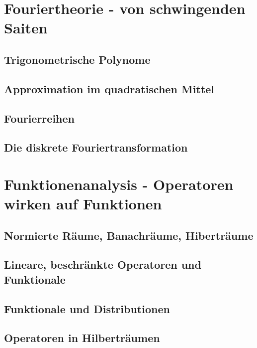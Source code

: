 \documentclass[a4paper]{article}
\begin{document}
\newpage 
\section{Fouriertheorie - von schwingenden Saiten}
\subsection{Trigonometrische Polynome}


\subsection{Approximation im quadratischen Mittel}


\subsection{Fourierreihen}


\subsection{Die diskrete Fouriertransformation}



\newpage
\section{Funktionenanalysis - Operatoren wirken auf Funktionen}
\subsection{Normierte Räume, Banachräume, Hiberträume}


\subsection{Lineare, beschränkte Operatoren und Funktionale}


\subsection{Funktionale und Distributionen}


\subsection{Operatoren in Hilberträumen}
\end{document}
